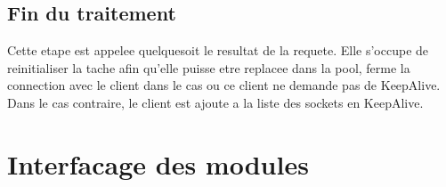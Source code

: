 \subsection {Fin du traitement}
Cette etape est appelee quelquesoit le resultat de la requete. Elle s'occupe de reinitialiser la tache afin qu'elle puisse etre replacee dans la pool, ferme la connection avec le client dans le cas ou ce client ne demande pas de KeepAlive. Dans le cas contraire, le client est ajoute a la liste des sockets en KeepAlive.

\section {Interfacage des modules}

